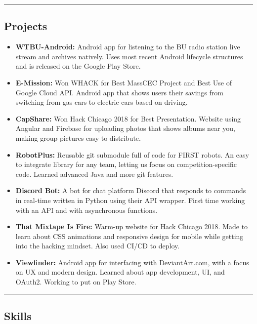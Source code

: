 \documentclass[11pt,letterpaper]{article}
\begin{document}
\hrule
\vspace{-0.4em}
\subsection*{Projects}

\begin{itemize}
	\parskip=0.1em
	
	\item \textbf{WTBU-Android:}
		Android app for listening to the BU radio station live stream and archives natively. Uses most recent Android lifecycle structures and is released on the Google Play Store. 
	
	\item \textbf{E-Mission:}
		Won WHACK for Best MassCEC Project and Best Use of Google Cloud API. Android app that shows users their savings from switching from gas cars to electric cars based on driving. 
	
	\item \textbf{CapShare:}
		Won Hack Chicago 2018 for Best Presentation. Website using Angular and Firebase for uploading photos that shows albums near you, making group pictures easy to distribute. 
		
	\item \textbf{RobotPlus:}
		Reusable git submodule full of code for FIRST robots. An easy to integrate library for any team, letting us focus on competition-specific code. Learned advanced Java and more git features. 
		
	\item \textbf{Discord Bot:}
		A bot for chat platform Discord that responds to commands in real-time written in Python using their API wrapper. First time working with an API and with asynchronous functions.
		
	\item \textbf{That Mixtape Is Fire:}
		Warm-up website for Hack Chicago 2018. Made to learn about CSS animations and responsive design for mobile while getting into the hacking mindset. Also used CI/CD to deploy. 
	
	\item \textbf{Viewfinder:}
		Android app for interfacing with DeviantArt.com, with a focus on UX and modern design.  Learned about app development, UI, and OAuth2. Working to put on Play Store.

\end{itemize}

\hrule
\vspace{-0.4em}
\subsection*{Skills}
\end{document}
